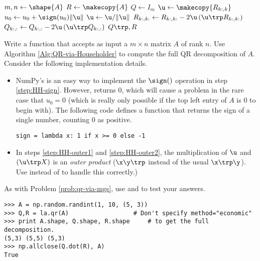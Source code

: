 \begin{algorithm}[H] %
\begin{algorithmic}[1]
    \State $m, n \gets \shape{A}$
    \State $R \gets \makecopy{A}$
    \State $Q \gets I_{m}$
        \State $\u \gets \makecopy{R_{k:,k}}$
        \State $u_0 \gets u_0 + \sign(u_0)\|\u\|$
            \label{step:HH-sign}
        \State $\u \gets \u/\|\u\|$
        \State $R_{k:,k:} \gets R_{k:,k:} - 2\u\left(\u\trp R_{k:,k:}\right)$
            \label{step:HH-outer1}
        \State $Q_{k:,:} \gets Q_{k:,:} - 2\u\left(\u\trp Q_{k:,:}\right)$
            \label{step:HH-outer2}
    \EndFor
    \State {} $Q\trp, R$
\EndProcedure
\end{algorithmic}
\caption{}
\label{Alg:QR-via-Householder}
\end{algorithm}

\begin{problem} %
Write a function that accepts as input a $m \times n$ matrix $A$ of rank $n$.
Use Algorithm \ref{Alg:QR-via-Householder} to compute the full QR decomposition of $A$.
Consider the following implementation details.
\begin{itemize}

\item NumPy's  is an easy way to implement the $\sign()$ operation in step \ref{step:HH-sign}.
However,  returns $0$, which will cause a problem in the rare case that $u_0 = 0$ (which is really only possible if the top left entry of $A$ is $0$ to begin with).
The following code defines a function that returns the sign of a single number, counting $0$ as positive.

\begin{lstlisting}
sign = lambda x: 1 if x >= 0 else -1
\end{lstlisting}

\item In steps \ref{step:HH-outer1} and \ref{step:HH-outer2}, the multiplication of $\u$ and $(\u\trp X)$ is an \emph{outer product} ($\x\y\trp$ instead of the usual $\x\trp\y$).
Use  instead of  to handle this correctly.)

\end{itemize}

As with Problem \ref{prob:qr-via-mgs}, use  and  to test your answers.

\begin{lstlisting}
>>> A = np.random.randint(1, 10, (5, 3))
>>> Q,R = la.qr(A)                  # Don't specify method="economic"
>>> print A.shape, Q.shape, R.shape     # to get the full decomposition.
(5,3) (5,5) (5,3)
>>> np.allclose(Q.dot(R), A)
True
\end{lstlisting}
\label{prob:qr-via-hessenberg}
\end{problem}

